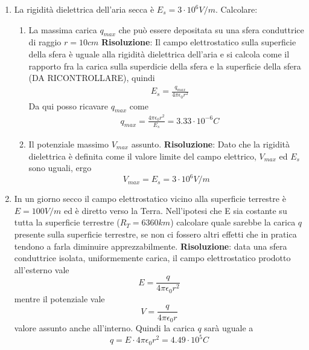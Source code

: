 \documentclass{book}
\begin{document}
\begin{enumerate}
    \item La rigidità dielettrica dell'aria secca è $E_s=3\cdot 10^6V/m$. Calcolare:
        \begin{enumerate}
            \item La massima carica  $q_{max}$ che può essere depositata su una sfera conduttrice di raggio $r=10cm$ \newline
            \textbf{Risoluzione}: Il campo elettrostatico sulla superficie della sfera è uguale alla rigidità dielettrica dell'aria e si calcola come il rapporto fra la carica sulla superdicie della sfera e la superficie della sfera (DA RICONTROLLARE), quindi
                \begin{align*}
                    & E_s = \frac{q_{max}}{4\pi \epsilon_0 r^2}
                \end{align*}
                Da qui posso ricavare $q_{max}$ come
                \begin{align*}
                    & q_{max} = \frac{4 \pi \epsilon_0 r^2}{E_s} = 3.33 \cdot 10^{-6}C
                \end{align*}
            \item Il potenziale massimo $V_{max}$ assunto.\newline
            \textbf{Risoluzione}: Dato che la rigidità dielettrica è definita come il valore limite del campo elettrico, $V_{max}$ ed $E_s$ sono uguali, ergo
                \begin{equation*}
                    V_{max} = E_s = 3 \cdot 10^6V/m
                \end{equation*}
        \end{enumerate}

    \item In un giorno secco il campo elettrostatico vicino alla superficie terrestre è $E = 100V/m$ ed è diretto verso la Terra. Nell'ipotesi che E sia costante su tutta la superficie terrestre ($R_T=6360km$) calcolare quale sarebbe la carica $q$ presente sulla superficie terrestre, se non ci fossero altri effetti che in pratica tendono a farla diminuire apprezzabilmente. \newline
        \textbf{Risoluzione}:  data una sfera conduttrice isolata, uniformemente carica, il campo elettrostatico prodotto all'esterno vale
        \begin{equation*} 
            E=\frac{q}{4\pi\epsilon_0 r^2}
        \end{equation*}
        mentre il potenziale vale
        \begin{equation*} 
            V=\frac{q}{4\pi\epsilon_0 r}
        \end{equation*}
        valore assunto anche all'interno. Quindi la carica $q$ sarà uguale a 
        \begin{equation*}
            q=E \cdot 4\pi\epsilon_0 r^2=4.49\cdot 10^5C
        \end{equation*}


\end{enumerate}
\end{document}

